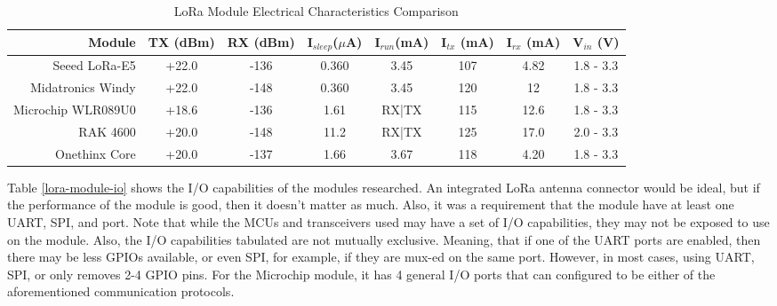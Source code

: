 \begin{table}[H]
\centering\scriptsize
\caption{LoRa Module Electrical Characteristics Comparison}
\begin{tabular}{|r|c|c|c|c|c|c|c|}
\hline
Module & TX (dBm) & RX (dBm) & I$_{sleep}$($\mu$A) & I$_{run}$(mA) & I$_{tx}$
(mA) & I$_{rx}$ (mA) &  V$_{in}$ (V) \\
\hline\hline

Seeed LoRa-E5       & +22.0 & -136  & 0.360   & 3.45    & 107 & 4.82  & 1.8 - 3.3 \\\hline
Midatronics Windy   & +22.0 & -148  & 0.360   & 3.45    & 120 & 12    & 1.8 - 3.3 \\\hline
Microchip WLR089U0  & +18.6 & -136  & 1.61    & RX|TX   & 115 & 12.6  & 1.8 - 3.3 \\\hline
RAK 4600            & +20.0 & -148  & 11.2    & RX|TX   & 125 & 17.0  & 2.0 - 3.3 \\\hline
Onethinx Core       & +20.0 & -137  & 1.66    & 3.67    & 118 & 4.20  & 1.8 - 3.3 \\\hline

\end{tabular}
\label{lora-module-electrical-comp}
\end{table}

Table \ref{lora-module-io} shows the I/O capabilities of the modules researched. An
integrated LoRa antenna connector would be ideal, but if the performance of the
module is good, then it doesn't matter as much. Also, it was a requirement that
the module have at least one UART, SPI, and \iic port. Note that while the MCUs
and transceivers used may have a set of I/O capabilities, they may not be
exposed to use on the module. Also, the I/O capabilities tabulated are not
mutually exclusive. Meaning, that if one of the UART ports are enabled, then
there may be less GPIOs available, or even SPI, for example, if they are mux-ed
on the same port. However, in most cases, using UART, SPI, or \iic only
removes 2-4 GPIO pins. For the Microchip module, it has 4 general I/O ports that
can configured to be either of the aforementioned communication protocols.

